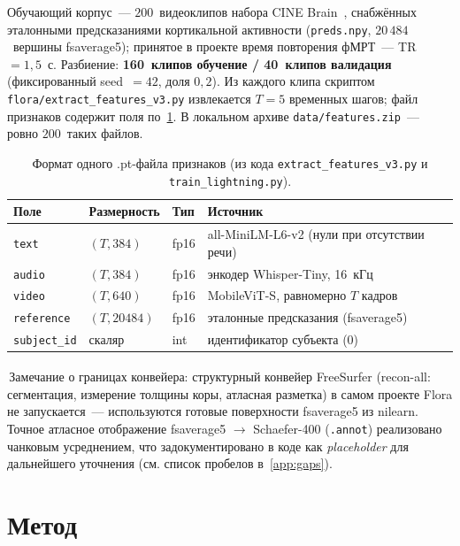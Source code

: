 \documentclass[11pt,a4paper]{article}
\begin{document}
Обучающий корпус~--- $200$~видеоклипов набора CINE
Brain~\cite{CINEBrain,Gao2025cinebrain}, снабжённых эталонными
предсказаниями кортикальной активности (\texttt{preds.npy},
$20\,484$~вершины fsaverage5); принятое в проекте время
повторения фМРТ~--- TR~$=1{,}5$~с. Разбиение:
\textbf{160~клипов обучение / 40~клипов валидация} (фиксированный
seed~$=42$, доля $0{,}2$). Из каждого клипа скриптом
\texttt{flora/extract\_features\_v3.py} извлекается $T=5$ временных
шагов; файл признаков содержит поля по~\cref{tab:ptformat}.
В локальном архиве \texttt{data/features.zip}~--- ровно $200$~таких
файлов.

\begin{table}[H]
\centering
\caption{Формат одного .pt-файла признаков (из кода
\texttt{extract\_features\_v3.py} и \texttt{train\_lightning.py}).}
\label{tab:ptformat}
\small
\begin{tabular}{llll}
\toprule
Поле & Размерность & Тип & Источник \\
\midrule
\texttt{text}   & $(T, 384)$   & fp16 & all-MiniLM-L6-v2 (нули при отсутствии речи) \\
\texttt{audio}  & $(T, 384)$   & fp16 & энкодер Whisper-Tiny, 16~кГц \\
\texttt{video}  & $(T, 640)$   & fp16 & MobileViT-S, равномерно $T$ кадров \\
\texttt{reference}& $(T, 20484)$ & fp16 & эталонные предсказания (fsaverage5) \\
\texttt{subject\_id} & скаляр & int & идентификатор субъекта (0) \\
\bottomrule
\end{tabular}
\end{table}

\textsuperscript{\textdagger}\,Замечание о границах конвейера: структурный
конвейер FreeSurfer (recon-all: сегментация, измерение толщины
коры, атласная разметка) в самом проекте Flora не запускается~---
используются готовые поверхности fsaverage5 из nilearn. Точное
атласное отображение fsaverage5 $\rightarrow$ Schaefer-400
(\texttt{.annot}) реализовано чанковым усреднением, что
задокументировано в коде как \emph{placeholder} для дальнейшего
уточнения (см. список пробелов в~\cref{app:gaps}).

\section{Метод}
\label{sec:method}
\end{document}
